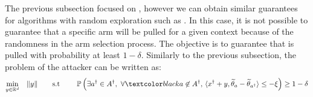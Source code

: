The previous subsection focused on \linucb, however we can obtain similar guarantees for  algorithms with random exploration such as \lints. In this case, it is not possible to guarantee that a specific arm will be pulled for a given context because of the randomness in the arm selection process. The objective is to guarantee that  is pulled with probability at least $1-\delta$.
Similarly to the previous subsection, the problem of the attacker can be written as: %
\begin{equation}\label{eq:TS_attack_one_user}
\begin{aligned}
\min_{y\in \mathbb{R}^{d}} \quad & \| y \| \quad \quad \text{s.t }\quad &  \mathbb{P}\left( \exists {a^\dagger\in A^\dagger},~\forall \changebrtwo{a\not\in A^{\dagger},~} \langle x^{\dagger} + y, \wt{\theta}_{a} - \wt{\theta}_{a^{\dagger}} \rangle \leq - \xi\right) \geq 1 - \delta
\end{aligned}
\end{equation}

